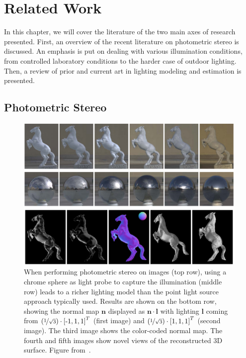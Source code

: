 \chapter{Related Work}

In this chapter, we will cover the literature of the two main axes of research presented. First, an overview of the recent literature on photometric stereo is discussed. An emphasis is put on dealing with various illumination conditions, from controlled laboratory conditions to the harder case of outdoor lighting. Then, a review of prior and current art in lighting modeling and estimation is presented. 


\section{Photometric Stereo}


\begin{figure}
\centering
\includegraphics[width=0.96\linewidth]{3rdparty/yu-summary.png}
\caption[State-of-the-art calibrated photometric stereo]{When performing photometric stereo on images (top row), using a chrome sphere as light probe to capture the illumination (middle row) leads to a richer lighting model than the point light source approach typically used. Results are shown on the bottom row, showing the normal map $\mathbf{n}$ displayed as $\mathbf{n}\cdot\mathbf{l}$ with lighting $\mathbf{l}$ coming from $\left(\nicefrac{1}{\sqrt{3}}\right) \cdot \left[\text{-}1, 1, 1\right]^T$ (first image) and $\left( \nicefrac{1}{\sqrt{3}} \right) \cdot \left[1, 1, 1\right]^T$ (second image). The third image shows the color-coded normal map. The fourth and fifth images show novel views of the reconstructed 3D surface. Figure from~\cite{yu-iccp-13}.}
\label{fig:yu_summary}
\end{figure}

